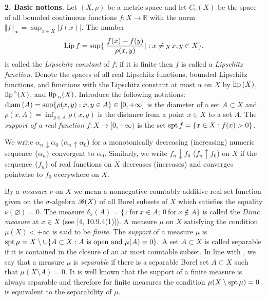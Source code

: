 \documentclass[11pt,a4paper]{article}
\begin{document}
\vspace{2em}
{\bf 2. Basic notions.} %
Let $(X,\rho)$ be a metric space and let $C_b(X)$ be the space of
all bounded continuous functions $f:X\to\mathbb{R}$ with the norm
$\Vert f\Vert_{\infty}=\sup_{x\in X}|f(x)|$.
The number
$${\rm Lip\,} f=\sup\{|\frac{f(x)-f(y)}{\rho(x,y)}|: x\ne y\; x,y\in X\}.$$
is called the \emph{Lipschitz constant} of $f$;
if it is finite then $f$ is called a \emph{Lipschitz function}.
Denote the spaces of all real Lipschitz functions,
bounded Lipschitz functions, and functions with the Lipschitz
constant at most $\alpha$ on $X$ by
${\rm lip\,}(X)$, ${\rm lip\,}^{\circ}(X)$, and ${\rm lip\,}_{\alpha}(X)$.
Introduce the following notations:
${\rm diam\,}(A)=\sup\{\rho(x,y): x,y\in A\} \in[0,+\infty]$
is the diameter of a set $A\subset X$ and
$\rho(x,A)=\inf_{y\in A}\rho(x,y)$
is the distance from a point $x\in X$ to a set $A$.
The \emph{support of a real function} $f:X\to [0,+\infty)$ is the set
${\rm spt\,} f=\{x\in X: f(x)>0\}$.

We write $\alpha_n\downarrow\alpha_0$ ($\alpha_n\uparrow\alpha_0$)
for a monotonically decreasing (increasing) numeric
sequence $\{\alpha_n\}$ convergent to $\alpha_0$.
Similarly, we write ${f_n\downarrow f_0}$ (${f_n\uparrow f_0}$)
on $X$ if the sequence $\{f_n\}$ of real functions on $X$
decreases (increases) and converges pointwise to $f_0$ everywhere on $X$.

By a \emph{measure} $\nu$ on $X$ we mean a nonnegative
countably additive real set function given on the $\sigma$-algebra
${\cal B}(X)$ of all Borel subsets of $X$
which satisfies the equality $\nu(\varnothing)=0$.
The measure
$\delta_x(A)=\{1 ~\mbox{for}~ x\in A;~ 0 ~\mbox{for}~ x\not\in A\}$
is called the \emph{Dirac measure} at $x\in X$ (see [4, 10.9.4(1)]).
A measure $\mu$ on $X$
satisfying the condition $\mu(X)<+\infty$ is said to be \emph{finite}.
The \emph{support} of a measure $\mu$ is
${\rm spt\,}\mu=X\setminus\cup\{A\subset X: A ~\mbox{is open and}~\mu(A)=0 \}.$
A set $A\subset X$ is called separable if it is contained in the closure
of an at most countable subset.
In line with \cite[Chapter 1,\S 1.]{Bl},
we say that a measure $\mu$ is \emph{separable} if there is
a separable Borel set $A\subset X$ such that $\mu(X\setminus A)=0$.
It is well known \cite[2.2.16]{Fd} that the support of
a finite measure is always separable and therefore for finite measures the condition $\mu(X\setminus{\rm spt\,}\mu)=0$
is equivalent to the separability of $\mu$.
\end{document}
